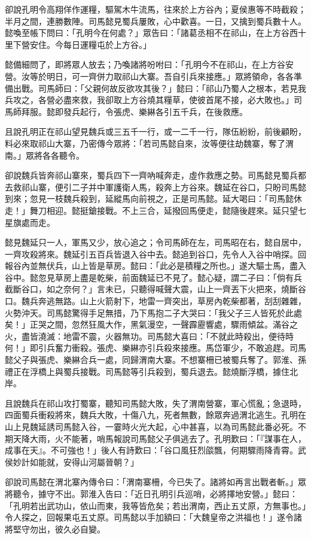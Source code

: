 卻說孔明令高翔佯作運糧，驅駕木牛流馬，往來於上方谷內；夏侯惠等不時截殺；半月之間，連勝數陣。司馬懿見蜀兵屢敗，心中歡喜。一日，又擒到蜀兵數十人。懿喚至帳下問曰：「孔明今在何處？」眾告曰：「諸葛丞相不在祁山，在上方谷西十里下營安住。今每日運糧屯於上方谷。」

懿備細問了，即將眾人放去；乃喚諸將吩咐曰：「孔明今不在祁山，在上方谷安營。汝等於明日，可一齊併力取祁山大寨。吾自引兵來接應。」眾將領命，各各準備出戰。司馬師曰：「父親何故反欲攻其後？」懿曰：「祁山乃蜀人之根本，若見我兵攻之，各營必盡來救，我卻取上方谷燒其糧草，使彼首尾不接，必大敗也。」司馬師拜服。懿即發兵起行，令張虎、樂綝各引五千兵，在後救應。

且說孔明正在祁山望見魏兵或三五千一行，或一二千一行，隊伍紛紛，前後顧盼，料必來取祁山大寨，乃密傳今眾將：「若司馬懿自來，汝等便往劫魏寨，奪了渭南。」眾將各各聽令。

卻說魏兵皆奔祁山寨來，蜀兵四下一齊吶喊奔走，虛作救應之勢。司馬懿見蜀兵都去救祁山寨，便引二子并中軍護衛人馬，殺奔上方谷來。魏延在谷口，只盼司馬懿到來；忽見一枝魏兵殺到，延縱馬向前視之，正是司馬懿。延大喝曰：「司馬懿休走！」舞刀相迎。懿挺鎗接戰。不上三合，延撥回馬便走，懿隨後趕來。延只望七星旗處而走。

懿見魏延只一人，軍馬又少，放心追之；令司馬師在左，司馬昭在右，懿自居中，一齊攻殺將來。魏延引五百兵皆退入谷中去。懿追到谷口，先令人入谷中哨探。回報谷內並無伏兵，山上皆是草房。懿曰：「此必是積糧之所也。」遂大驅士馬，盡入谷中。懿忽見草房上盡是乾柴，前面魏延已不見了。懿心疑，謂二子曰：「倘有兵截斷谷口，如之奈何？」言未已，只聽得喊聲大震，山上一齊丟下火把來，燒斷谷口。魏兵奔逃無路。山上火箭射下，地雷一齊突出，草房內乾柴都著，刮刮雜雜，火勢沖天。司馬懿驚得手足無措，乃下馬抱二子大哭曰：「我父子三人皆死於此處矣！」正哭之間，忽然狂風大作，黑氣漫空，一聲霹靂響處，驟雨傾盆。滿谷之火，盡皆澆滅：地雷不震，火器無功。司馬懿大喜曰：「不就此時殺出，便待時何！」即引兵奮力衝殺。張虎、樂綝亦引兵殺來接應。馬岱軍少，不敢追趕。司馬懿父子與張虎、樂綝合兵一處，同歸渭南大寨。不想寨柵已被蜀兵奪了。郭淮、孫禮正在浮橋上與蜀兵接戰。司馬懿等引兵殺到，蜀兵退去。懿燒斷浮橋，據住北岸。

且說魏兵在祁山攻打蜀寨，聽知司馬懿大敗，失了渭南營寨，軍心慌亂；急退時，四面蜀兵衝殺將來，魏兵大敗，十傷八九，死者無數，餘眾奔過渭北逃生。孔明在山上見魏延誘司馬懿入谷，一霎時火光大起，心中甚喜，以為司馬懿此番必死。不期天降大雨，火不能著，哨馬報說司馬懿父子俱逃去了。孔明歎曰：「『謀事在人，成事在天』。不可強也！」後人有詩歎曰：「谷口風狂烈燄飄，何期驟雨降青霄。武侯妙計如能就，安得山河屬晉朝？」

卻說司馬懿在渭北寨內傳令曰：「渭南寨柵，今已失了。諸將如再言出戰者斬。」眾將聽令，據守不出。郭淮入告曰：「近日孔明引兵巡哨，必將擇地安營。」懿曰：「孔明若出武功山，依山而東，我等皆危矣；若出渭南，西止五丈原，方無事也。」令人探之，回報果屯五丈原。司馬懿以手加額曰：「大魏皇帝之洪福也！」遂令諸將堅守勿出，彼久必自變。

